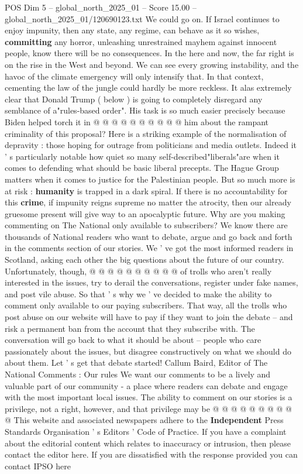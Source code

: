 \begin{textsample}{POS Dim 5 – global\_north\_2025\_01 – Score 15.00 – global\_north\_2025\_01/120690123.txt}
We could go on.
If Israel continues to enjoy impunity, then any state, any regime, can behave as it so wishes, \textbf{committing} any horror, unleashing unrestrained mayhem against innocent people, know there will be no consequences.
In the here and now, the far right is on the rise in the West and beyond.
We can see every growing instability, and the havoc of the climate emergency will only intensify that.
In that context, cementing the law of the jungle could hardly be more reckless.
It alas extremely clear that Donald Trump ( below ) is going to completely disregard any semblance of a"rules-based order".
His task is so much easier precisely because Biden helped torch it in @ @ @ @ @ @ @ @ @ @ him about the rampant criminality of this proposal?
Here is a striking example of the normalisation of depravity : those hoping for outrage from politicians and media outlets.
Indeed it ' s particularly notable how quiet so many self-described"liberals"are when it comes to defending what should be basic liberal precepts.
The Hague Group matters when it comes to justice for the Palestinian people.
But so much more is at risk : \textbf{humanity} is trapped in a dark spiral.
If there is no accountability for this \textbf{crime}, if impunity reigns supreme no matter the atrocity, then our already gruesome present will give way to an apocalyptic future.
Why are you making commenting on The National only available to subscribers?
We know there are thousands of National readers who want to debate, argue and go back and forth in the comments section of our stories.
We ' ve got the most informed readers in Scotland, asking each other the big questions about the future of our country.
Unfortunately, though, @ @ @ @ @ @ @ @ @ @ of trolls who aren't really interested in the issues, try to derail the conversations, register under fake names, and post vile abuse.
So that ' s why we ' ve decided to make the ability to comment only available to our paying subscribers.
That way, all the trolls who post abuse on our website will have to pay if they want to join the debate -- and risk a permanent ban from the account that they subscribe with.
The conversation will go back to what it should be about -- people who care passionately about the issues, but disagree constructively on what we should do about them.
Let ' s get that debate started!
Callum Baird, Editor of The National Comments : Our rules We want our comments to be a lively and valuable part of our community - a place where readers can debate and engage with the most important local issues.
The ability to comment on our stories is a privilege, not a right, however, and that privilege may be @ @ @ @ @ @ @ @ @ @ This website and associated newspapers adhere to the \textbf{Independent} Press Standards Organisation ' s Editors ' Code of Practice.
If you have a complaint about the editorial content which relates to inaccuracy or intrusion, then please contact the editor here.
If you are dissatisfied with the response provided you can contact IPSO here

\end{textsample}
